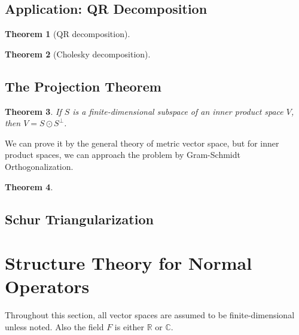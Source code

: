 \documentclass{book}
\newtheorem{theorem}{Theorem}[section]
\theoremstyle{definition}
\begin{document}
\subsection{Application: QR Decomposition}
\begin{theorem}[QR decomposition]
    
\end{theorem}

\begin{theorem}[Cholesky decomposition]
    
\end{theorem}

\subsection{The Projection Theorem}
\begin{theorem}
If $S$ is a finite-dimensional subspace of an inner product space $V$, then $V=S\odot S^\perp$.
\end{theorem}
We can prove it by the general theory of metric vector space, but for inner product spaces, we can approach the problem by Gram-Schmidt Orthogonalization.
\begin{theorem}

\end{theorem}




\subsection{Schur Triangularization}




\section{Structure Theory for Normal Operators}
Throughout this section, all vector spaces are assumed to be finite-dimensional unless noted. Also the field $F$ is either $\mathbb{R}$ or $\mathbb{C}$.
\end{document}
